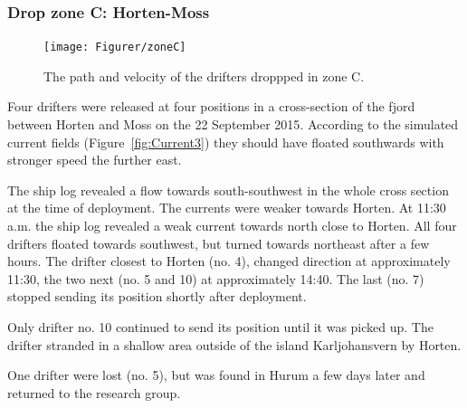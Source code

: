 \documentclass[12pt,a4paper,english]{article}
\begin{document}
\subsubsection{Drop zone C: Horten-Moss}
%
\begin{figure}[ht]
\centerline{
\texttt{[image: Figurer/zoneC]}}
\caption{\small
The path and velocity of the drifters droppped in zone C.}
\label{fig:ZoneC}
\end{figure}
%
%
Four drifters were released at four positions in a cross-section of the fjord between Horten and Moss on the 22 September 2015. According to the simulated current fields (Figure~\ref{fig:Current3}) they should have floated southwards with stronger speed the further east. 

The ship log revealed a flow towards south-southwest in the whole cross section at the time of deployment. The currents were weaker towards Horten. At 11:30 a.m. the ship log revealed a weak current towards north close to Horten. All four drifters floated towards southwest, but turned towards northeast after a few hours. The drifter closest to Horten (no. 4), changed direction at approximately 11:30, the two next (no. 5 and 10) at approximately 14:40. The last (no. 7) stopped sending its position shortly after deployment.

Only drifter no. 10 continued to send its position until it was picked up. The drifter stranded in a shallow area outside of the island Karljohansvern by Horten.

One drifter were lost (no. 5), but was found in Hurum a few days later and returned to the research group.

\end{document}
